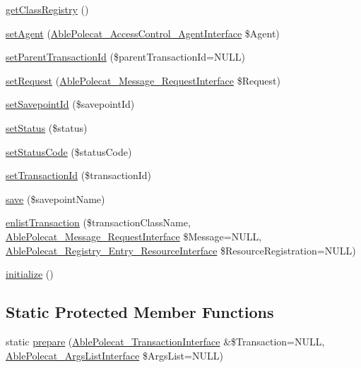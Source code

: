 \begin{DoxyCompactItemize}
\item 
\hyperlink{class_able_polecat___transaction_abstract_a093abe716e268a9511faf781e09a953c}{get\+Class\+Registry} ()
\item 
\hyperlink{class_able_polecat___transaction_abstract_a74ab20081113cbf1896e7e6ee9c98fdb}{set\+Agent} (\hyperlink{interface_able_polecat___access_control___agent_interface}{Able\+Polecat\+\_\+\+Access\+Control\+\_\+\+Agent\+Interface} \$Agent)
\item 
\hyperlink{class_able_polecat___transaction_abstract_a28e07bfe92afb2d6f56bc1ad89230666}{set\+Parent\+Transaction\+Id} (\$parent\+Transaction\+Id=N\+U\+L\+L)
\item 
\hyperlink{class_able_polecat___transaction_abstract_a291928c3f6899b2bafac8a1282c29408}{set\+Request} (\hyperlink{interface_able_polecat___message___request_interface}{Able\+Polecat\+\_\+\+Message\+\_\+\+Request\+Interface} \$Request)
\item 
\hyperlink{class_able_polecat___transaction_abstract_ab9f31f11be87e4ec737bc13f8461a00a}{set\+Savepoint\+Id} (\$savepoint\+Id)
\item 
\hyperlink{class_able_polecat___transaction_abstract_a7d02c100d684fe1dffc6cb3486a48511}{set\+Status} (\$status)
\item 
\hyperlink{class_able_polecat___transaction_abstract_ad9678b5757353b0669ffb7b587e42bad}{set\+Status\+Code} (\$status\+Code)
\item 
\hyperlink{class_able_polecat___transaction_abstract_afdfe179c06dfde891b92f8f93daa8bb6}{set\+Transaction\+Id} (\$transaction\+Id)
\item 
\hyperlink{class_able_polecat___transaction_abstract_a4affc269a4cd2826879b393b53a99f93}{save} (\$savepoint\+Name)
\item 
\hyperlink{class_able_polecat___transaction_abstract_a408197ada51983728340d3368e710834}{enlist\+Transaction} (\$transaction\+Class\+Name, \hyperlink{interface_able_polecat___message___request_interface}{Able\+Polecat\+\_\+\+Message\+\_\+\+Request\+Interface} \$Message=N\+U\+L\+L, \hyperlink{interface_able_polecat___registry___entry___resource_interface}{Able\+Polecat\+\_\+\+Registry\+\_\+\+Entry\+\_\+\+Resource\+Interface} \$Resource\+Registration=N\+U\+L\+L)
\item 
\hyperlink{class_able_polecat___transaction_abstract_a91098fa7d1917ce4833f284bbef12627}{initialize} ()
\end{DoxyCompactItemize}
\subsection*{Static Protected Member Functions}
\begin{DoxyCompactItemize}
\item 
static \hyperlink{class_able_polecat___transaction_abstract_a1dc9979cc10b0ac14225853f9737f90a}{prepare} (\hyperlink{interface_able_polecat___transaction_interface}{Able\+Polecat\+\_\+\+Transaction\+Interface} \&\$Transaction=N\+U\+L\+L, \hyperlink{interface_able_polecat___args_list_interface}{Able\+Polecat\+\_\+\+Args\+List\+Interface} \$Args\+List=N\+U\+L\+L)
\end{DoxyCompactItemize}
